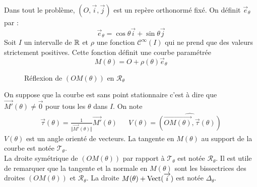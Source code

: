 Dans tout le problème, $(O,\overrightarrow{i},\overrightarrow{j})$ est un repère orthonormé fixé. On définit $\overrightarrow{e}_\theta$ par :
\[\overrightarrow{e}_\theta=\cos \theta \overrightarrow{i} + \sin \theta \overrightarrow{j}\]
Soit $I$ un intervalle de $\mathbb{R}$ et $\rho$ une fonction $\mathcal{C}^\infty(I)$ qui ne prend que des valeurs strictement positives. Cette fonction définit une courbe paramétrée
\[M(\theta)=O+\rho(\theta)\overrightarrow{e}_\theta\]
\begin{figure}[ht]
   \centering
   
   \caption{Réflexion de $(OM(\theta))$ en $\mathcal{R}_\theta$}
   \label{fig:caustic_1}
\end{figure}
On suppose que la courbe est sans point stationnaire c'est à dire que $\overrightarrow{M'}(\theta)\neq \overrightarrow{0}$ pour tous les $\theta$ dans $I$. On note
\begin{align*}
\overrightarrow{\tau}(\theta)=\frac{1}{\Vert \overrightarrow{M'}(\theta) \Vert}\overrightarrow{M'}(\theta) 
& &
V(\theta) = \widehat{(\overrightarrow{OM(\theta)},\overrightarrow{\tau}(\theta))}
\end{align*}
$V(\theta)$ est un angle orienté de vecteurs.\newline
La tangente en $M(\theta)$ au support de la courbe est notée $\mathcal{T}_\theta$.\\ La droite symétrique de $(OM(\theta))$ par rapport à $\mathcal{T}_\theta$ est notée $\mathcal{R}_\theta$.\newline
Il est utile de remarquer que la tangente et la normale en $M(\theta)$ sont les bissectrices des droites $(OM(\theta))$ et $\mathcal{R}_\theta$.\newline
La droite $M(\theta)+\operatorname{Vect}(\overrightarrow i)$ est notée $\Delta_\theta$.

